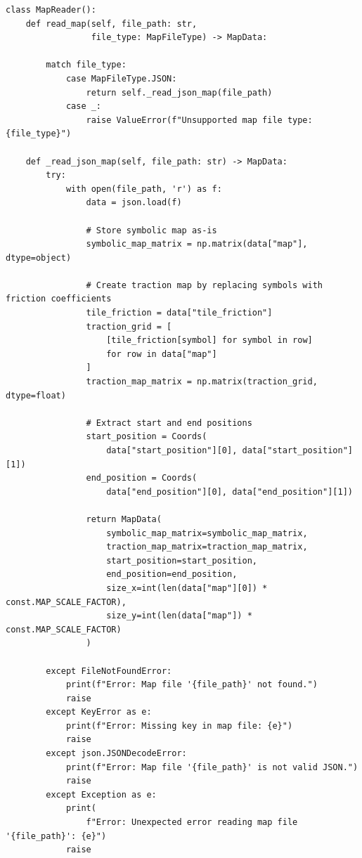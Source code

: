 \documentclass{article}
\begin{document}
\begin{verbatim}
class MapReader():
    def read_map(self, file_path: str,
                 file_type: MapFileType) -> MapData:

        match file_type:
            case MapFileType.JSON:
                return self._read_json_map(file_path)
            case _:
                raise ValueError(f"Unsupported map file type: {file_type}")

    def _read_json_map(self, file_path: str) -> MapData:
        try:
            with open(file_path, 'r') as f:
                data = json.load(f)

                # Store symbolic map as-is
                symbolic_map_matrix = np.matrix(data["map"], dtype=object)

                # Create traction map by replacing symbols with friction coefficients
                tile_friction = data["tile_friction"]
                traction_grid = [
                    [tile_friction[symbol] for symbol in row]
                    for row in data["map"]
                ]
                traction_map_matrix = np.matrix(traction_grid, dtype=float)

                # Extract start and end positions
                start_position = Coords(
                    data["start_position"][0], data["start_position"][1])
                end_position = Coords(
                    data["end_position"][0], data["end_position"][1])

                return MapData(
                    symbolic_map_matrix=symbolic_map_matrix,
                    traction_map_matrix=traction_map_matrix,
                    start_position=start_position,
                    end_position=end_position,
                    size_x=int(len(data["map"][0]) * const.MAP_SCALE_FACTOR),
                    size_y=int(len(data["map"]) * const.MAP_SCALE_FACTOR)
                )

        except FileNotFoundError:
            print(f"Error: Map file '{file_path}' not found.")
            raise
        except KeyError as e:
            print(f"Error: Missing key in map file: {e}")
            raise
        except json.JSONDecodeError:
            print(f"Error: Map file '{file_path}' is not valid JSON.")
            raise
        except Exception as e:
            print(
                f"Error: Unexpected error reading map file '{file_path}': {e}")
            raise

\end{verbatim}
\end{document}
